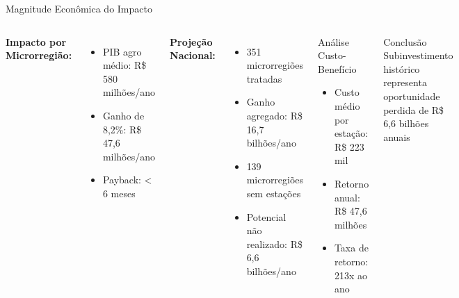 \documentclass[10pt,aspectratio=169]{beamer}
\begin{document}
\begin{frame}{Magnitude Econômica do Impacto}
\begin{columns}
\textbf{Impacto por Microrregião:}
\begin{itemize}
    \item PIB agro médio: R\$ 580 milhões/ano
    \item Ganho de 8,2\%: R\$ 47,6 milhões/ano
    \item Payback: < 6 meses
\end{itemize}

\textbf{Projeção Nacional:}
\begin{itemize}
    \item 351 microrregiões tratadas
    \item Ganho agregado: R\$ 16,7 bilhões/ano
    \item 139 microrregiões sem estações
    \item Potencial não realizado: R\$ 6,6 bilhões/ano
\end{itemize}

\begin{block}{Análise Custo-Benefício}
\begin{itemize}
    \item Custo médio por estação: R\$ 223 mil
    \item Retorno anual: R\$ 47,6 milhões
    \item Taxa de retorno: 213x ao ano
\end{itemize}
\end{block}

\begin{alertblock}{Conclusão}
Subinvestimento histórico representa oportunidade perdida de R\$ 6,6 bilhões anuais
\end{alertblock}
\end{columns}
\end{frame}
\end{document}
